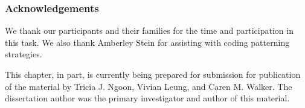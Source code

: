 \subsubsection{Acknowledgements}
We thank our participants and their families for the time and participation in this task. We also thank Amberley Stein for assisting with coding patterning strategies.

This chapter, in part, is currently being prepared for submission for publication of the material by Tricia J. Ngoon, Vivian Leung, and Caren M. Walker. The dissertation author was the primary investigator and author of this material.
